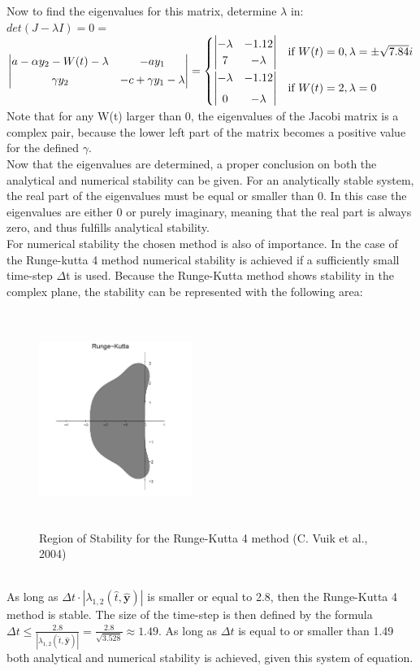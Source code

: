 \documentclass{article}
\begin{document}
Now to find the eigenvalues for this matrix, determine $\lambda$ in:\\[2ex] $det(J-\lambda I)= 0 =$
$\begin{vmatrix}
a-\alpha y_2-W(t)-\lambda &
    -a y_1 \\[1ex]
\gamma y_2 &
    -c + \gamma y_1 -\lambda
\end{vmatrix}=\\[2ex]\begin{cases}
\begin{vmatrix}
-\lambda &
    -1.12\\
7 &
    -\lambda
\end{vmatrix} &\mbox{if } W(t)=0, \lambda = \pm\sqrt{7.84}i\\[2ex]
\begin{vmatrix}
-\lambda &
    -1.12\\[1ex]
0 &
    -\lambda
\end{vmatrix} &\mbox{if } W(t)=2, \lambda = 0\\
\end{cases}$\\[2ex]
Note that for any W(t) larger than 0, the eigenvalues of the Jacobi matrix is a complex pair, because the lower left part of the matrix becomes a positive value for the defined $\gamma$. \\[2ex]
Now that the eigenvalues are determined, a proper conclusion on both the analytical and numerical stability can be given. For an analytically stable system, the real part of the eigenvalues must be equal or smaller than 0. In this case the eigenvalues are either 0 or purely imaginary, meaning that the real part is always zero, and thus fulfills analytical stability.\\[2ex]
For numerical stability the chosen method is also of importance. In the case of the Runge-kutta 4 method numerical stability is achieved if a sufficiently small time-step $\Delta$t is used. Because the Runge-Kutta method shows stability in the complex plane, the stability can be represented with the following area: \begin{figure}[h]\centering\includegraphics[width=5cm, height = 7cm]{RungeKutta ROC}\caption{Region of Stability for the Runge-Kutta 4 method (C. Vuik et al., 2004)}\label{fig:mesh2}\end{figure} \\As long as $\Delta t \cdot |\lambda_{1,2}(\hat{t},\boldsymbol{\hat{y}})|$ is smaller or equal to 2.8, then the Runge-Kutta 4 method is stable. The size of the time-step is then defined by the formula 
$\Delta t\leq \frac{2.8 }{|\lambda_{1,2}(\hat{t},\boldsymbol{\hat{y}})|}=\frac{2.8}{\sqrt{3.528}}\approx 1.49$. As long as $\Delta t$ is equal to or smaller than 1.49 both analytical and numerical stability is achieved, given this system of equation.
\end{document}
